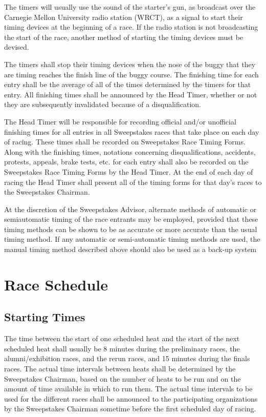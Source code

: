 	The timers will usually use the sound of the starter's gun, as broadcast over
	the Carnegie Mellon University radio station (WRCT), as a signal to start their
	timing devices at the beginning of a race. If the radio station is not
	broadcasting the start of the race, another method of starting the timing
	devices must be devised.

	The timers shall stop their timing devices when the nose of the buggy that they
	are timing reaches the finish line of the buggy course. The finishing time for
	each entry shall be the average of all of the times determined by the timers
	for that entry. All finishing times shall be announced by the Head Timer,
	whether or not they are subsequently invalidated because of a disqualification.

	The Head Timer will be responsible for recording official and/or unofficial
	finishing times for all entries in all Sweepstakes races that take place on
	each day of racing. These times shall be recorded on Sweepstakes Race Timing
	Forms. Along with the finishing times, notations concerning disqualifications,
	accidents, protests, appeals, brake tests, etc. for each entry shall also be
	recorded on the Sweepstakes Race Timing Forms by the Head Timer. At the end of
	each day of racing the Head Timer shall present all of the timing forms for
	that day's races to the Sweepstakes Chairman.

	At the discretion of the Sweepstakes Advisor, alternate methods of automatic or
	semiautomatic timing of the race entrants may be employed, provided that these
	timing methods can be shown to be as accurate or more accurate than the usual
	timing method. If any automatic or semi-automatic timing methods are used, the
	manual timing method described above should also be used as a back-up system

\section{Race Schedule}

\subsection{Starting Times}

	The time between the start of one scheduled heat and the start of the next
	scheduled heat shall usually be 8 minutes during the preliminary races, the
	alumni/exhibition races, and the rerun races, and 15 minutes during the finals
	races. The actual time intervals between heats shall be determined by the
	Sweepstakes Chairman, based on the number of heats to be run and on the amount
	of time available in which to run them. The actual time intervals to be used
	for the different races shall be announced to the participating organizations
	by the Sweepstakes Chairman sometime before the first scheduled day of racing.

